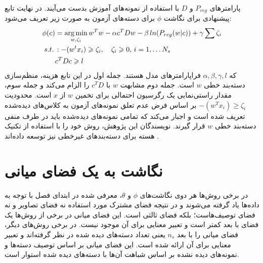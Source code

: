 پارامترهای $P_{reg}$ و $D$ با استفاده از نمونه‌های آموزش بدست می‌آیند.
در نهایت تابع پیشنهادی برای نگاشت $\phi$ برای دسته‌های آزمون به صورت زیر تعریف می‌شود:
\begin{align}
\label{eq:write_a}
\phi(c) &= \operatorname*{arg\,min}_{w,\zeta_i} w^Tw - \alpha c^TDw -\beta \, ln(P_{reg}(w|c)) + \gamma \sum \zeta_i \\
s.t. \, &: -(w^tx_i) \geqslant \zeta_i, \quad \zeta_i \geqslant 0, \, i=1,\ldots N_s  \nonumber \\
& c^TDc \geqslant l \nonumber
\end{align}
که $\alpha, \beta, \gamma, l$ فراپارامترهای مدل هستند. جمله اول در این تابع هزینه، منظم‌سازی دسته‌بند خطی $w$ است. جمله دوم مشابهت $w$ با $c^TD$ را الزام می‌کند و
 جمله سوم، مقدار راستی‌نمایی یک رگرسیون احتمالی برای تخمین $w$ از $x$ است.
  محدودیت $-(w^Tx_i) \geq \zeta_i$ بر اساس فرض عدم تعلق
نمونه‌های آزمون به کلاس‌های دیده‌شده تعریف شده است و اجبار می‌کند که تمامی نمونه‌های دیده‌شده باید در طرف منفی دسته‌بند خطی $w$ قرار گیرند.
نویسندگان این پژوهش، روش خود را با استفاده از تکنیک هسته
برای دسته‌بندهای غیرخطی نیز توسعه داده‌اند \cite{elhoseiny2015}.

\section{نگاشت به یک فضای میانی}
در برخی روش‌ها هر دوی نگاشت‌های $\phi$ و $\theta$، معرفی شده در ابتدای فصل با توجه به داده‌ها یاد گرفته می‌شوند و در نتیجه فضای مشترک مورد استفاده نه فضای تصاویر و نه فضای توصیف‌هاست؛ بلکه فضای ثالثی است. این فضای میانی در برخی از روش‌ها یک فضای با بعد کمتر است و تعبیر معنایی برای آن موجود نیست. در برخی روش‌های دیگر، فضای میانی را با بعد $n_s$ یعنی تعداد دسته‌های دیده شده در نظر گرفته‌اند و تعبیر معنایی برای آن ارائه شده است. این فضای میانی بر اساس توصیف دسته‌ها و نمونه‌های دیده نشده بر اساس شباهت آن‌ها با دسته‌های دیده شده استوار است.

